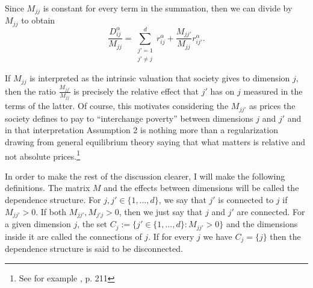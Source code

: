 \documentclass[english, a4paper,12pt]{article}
\begin{document}
Since $M_{jj}$ is constant for every term in the summation, then we can divide by $M_{jj}$ to obtain
	$$\frac{D_{ij}^{\alpha}}{M_{jj}} = \sum_{\substack{j'=1 \\ j' \neq j}}^{d} r_{ij}^{\alpha} + \frac{M_{jj'}}{M_{jj}}r_{ij'}^{\alpha}. $$

If $M_{jj}$ is interpreted as the intrinsic valuation that society gives to dimension $j$, then the ratio $\frac{M_{jj'}}{M_{jj}}$ is precisely the relative effect that $j'$ has on $j$ measured in the terms of the latter. Of course, this motivates considering the $M_{jj'}$ as prices the society defines to pay to ``interchange poverty'' between dimensions $j$ and $j'$ and in that interpretation Assumption 2 is nothing more than a regularization drawing from general equilibrium theory saying that what matters is relative and not absolute prices.\footnote{See for example \cite{JehleReny}, p. 211} 

In order to make the rest of the discussion clearer, I will make the following definitions. The matrix $M$ and the effects between dimensions will be called the dependence structure. For $j, j' \in \{1, \ldots, d\}$, we say that $j'$ is connected to $j$ if $M_{jj'} > 0$. If both $M_{jj'}, M_{j'j} > 0$, then we just say that $j$ and $j'$ are connected. For a given dimension $j$, the set $C_{j} := \{j' \in \{1, \ldots, d\} : M_{jj'} > 0\}$ and the dimensions inside it are called the connections of $j$. If for every $j$ we have $C_{j} = \{j\}$ then the dependence structure is said to be disconnected.
\end{document}
